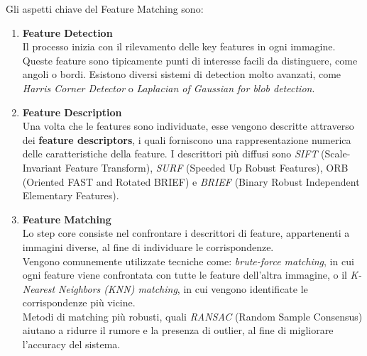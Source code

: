 \documentclass[12pt,a4paper,openright,twoside]{book}
\begin{document}
Gli aspetti chiave del Feature Matching sono:
\begin{enumerate}

\item \textbf{Feature Detection}\\
Il processo inizia con il rilevamento delle key features in ogni immagine. Queste feature sono tipicamente punti di interesse facili da distinguere, come angoli o bordi. Esistono diversi  sistemi di detection molto avanzati, come {\itshape Harris Corner Detector} o {\itshape Laplacian of Gaussian for blob detection}.

\item \textbf{Feature Description}\\
Una volta che le features sono individuate, esse vengono descritte attraverso dei \textbf{feature descriptors}, i quali forniscono  una rappresentazione numerica delle caratteristiche della feature. I descrittori più diffusi sono {\itshape SIFT} (Scale-Invariant Feature Transform), {\itshape SURF} (Speeded Up Robust Features), ORB (Oriented FAST and Rotated BRIEF) e {\itshape BRIEF} (Binary Robust Independent Elementary Features).

\item \textbf{Feature Matching}\\
Lo step core consiste nel confrontare i descrittori di feature, appartenenti a immagini diverse, al fine di individuare le corrispondenze. \\
Vengono comunemente utilizzate tecniche come: {\itshape brute-force matching}, in cui ogni feature viene confrontata con tutte le feature dell'altra immagine, o il  {\itshape K-Nearest Neighbors (KNN) matching}, in cui vengono identificate le corrispondenze più vicine.\\
Metodi di matching più robusti, quali {\itshape RANSAC} (Random Sample Consensus) aiutano a ridurre il rumore e la presenza di outlier, al fine di migliorare l'accuracy del sistema.

\end{enumerate}
\end{document}
